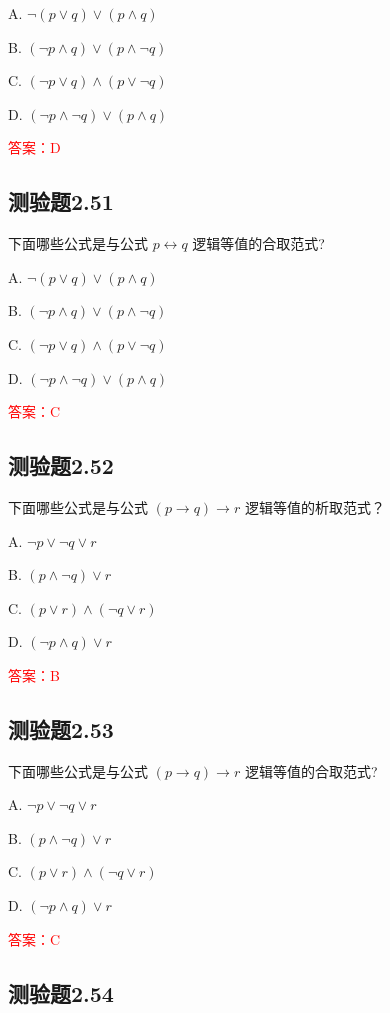 \documentclass[UTF8, heading=true]{ctexart}
\begin{document}
A. $\neg(p \vee q) \vee(p \wedge q)$

B. $(\neg p \wedge q) \vee(p \wedge \neg q)$

C. $(\neg p \vee q) \wedge(p \vee \neg q)$

D. $(\neg p \wedge \neg q) \vee(p \wedge q)$

\textcolor{red}{答案：D}

\subsection{测验题2.51}

下面哪些公式是与公式 $p \leftrightarrow q$ 逻辑等值的合取范式?

A. $\neg(p \vee q) \vee(p \wedge q)$

B. $(\neg p \wedge q) \vee(p \wedge \neg q)$

C. $(\neg p \vee q) \wedge(p \vee \neg q)$

D. $(\neg p \wedge \neg q) \vee(p \wedge q)$

\textcolor{red}{答案：C}

\subsection{测验题2.52}

下面哪些公式是与公式 $(p \rightarrow q) \rightarrow r$ 逻辑等值的析取范式？

A. $\neg p \vee \neg q \vee r$

B. $(p \wedge \neg q) \vee r$

C. $(p \vee r) \wedge(\neg q \vee r)$

D. $(\neg p \wedge q) \vee r$

\textcolor{red}{答案：B}

\subsection{测验题2.53}

下面哪些公式是与公式 $(p \rightarrow q) \rightarrow r$ 逻辑等值的合取范式?

A. $ \neg p \vee \neg q \vee r$

B. $(p \wedge \neg q) \vee r$

C. $(p \vee r) \wedge(\neg q \vee r)$

D. $(\neg p \wedge q) \vee r$

\textcolor{red}{答案：C}

\subsection{测验题2.54}
\end{document}

